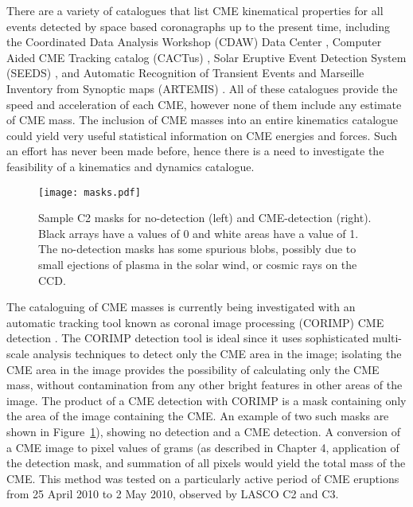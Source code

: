 There are a variety of catalogues that list CME kinematical properties for all events detected by space based coronagraphs up to the present time, including the Coordinated Data Analysis Workshop (CDAW) Data Center \citep{gopal2009b}, Computer Aided CME Tracking catalog (CACTus) \citep{robb2004}, Solar Eruptive Event Detection System (SEEDS) \citep{olmedo2008}, and  Automatic Recognition of Transient Events and Marseille Inventory from Synoptic maps (ARTEMIS) \citep{boursier2009}. All of these catalogues provide the speed and acceleration of each CME, however none of them include any estimate of CME mass. The inclusion of CME masses into an entire kinematics catalogue could yield very useful statistical information on CME energies and forces. Such an effort has never been made before, hence there is a need to investigate the feasibility of a kinematics and dynamics catalogue.
\begin{figure}[t!]
\begin{center}
\texttt{[image: masks.pdf]}
\caption{Sample C2 masks for no-detection (left) and CME-detection (right). Black arrays have a values of 0 and white areas have a value of 1. The no-detection masks has some spurious blobs, possibly due to small ejections of plasma in the solar wind, or cosmic rays on the CCD.}
\label{fig:masks}
\end{center}
\end{figure}

The cataloguing of CME masses is currently being investigated with an automatic tracking tool known as coronal image processing (CORIMP) CME detection \citep{byrne2012}. The CORIMP detection tool is ideal since it uses sophisticated multi-scale analysis techniques to detect only the CME area in the image; isolating the CME area in the image provides the possibility of calculating only the CME mass, without contamination from any other bright features in other areas of the image. The product of a CME detection with CORIMP is a mask containing only the area of the image containing the CME. An example of two such masks are shown in Figure~\ref{fig:masks}), showing no detection and a CME detection. A conversion of a CME image to pixel values of grams (as described in Chapter 4, application of the detection mask, and summation of all pixels would yield the total mass of the CME. This method was tested on a particularly active period of CME eruptions from 25 April 2010 to 2 May 2010, observed by LASCO C2 and C3. 

